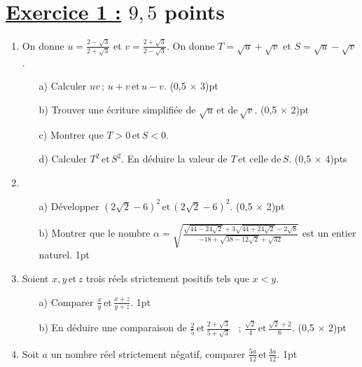 \documentclass[12pt,a4paper]{article}
\begin{document}
\section*{\underline{Exercice 1 :} $9,5$ points}

\begin{enumerate}
    \item On donne \( u = \frac{2 - \sqrt{3}}{2 + \sqrt{3}} \) et \( v = \frac{2 + \sqrt{3}}{2 - \sqrt{3}} \). On donne \( T = \sqrt{u} + \sqrt{v} \) et \( S = \sqrt{u} - \sqrt{v} \). 
    \begin{enumerate}
        \item[a)] Calculer \( uv \, ; \, u + v \, \text{et} \, u - v \). \hfill (0,5 $\times$ 3)pt
        \item[b)] Trouver une écriture simplifiée de \( \sqrt{u} \, \text{et de} \, \sqrt{v} \). \hfill (0,5 $\times$ 2)pt
        \item[c)] Montrer que \( T > 0 \, \text{et} \, S < 0 \). 
        \item[d)] Calculer \( T^2 \, \text{et} \, S^2 \). En déduire la valeur de \( T \, \text{et celle de} \, S \). \hfill (0,5 $\times$ 4)pts
    \end{enumerate}

    \item 
    \begin{enumerate}
        \item[a)] Développer \( (2\sqrt{2} - 6)^2 \, \text{et} \, (2\sqrt{2} - 6)^2 \). \hfill (0,5 $\times$ 2)pt
        \item[b)] Montrer que le nombre 
        \( \alpha = \sqrt{\frac{\sqrt{44 - 24\sqrt{2}} + 3\sqrt{44 + 24\sqrt{2}}- 2\sqrt{8}}{-18 + \sqrt{38 - 12\sqrt{2}} + \sqrt{32}}}        
        \) est un entier naturel. \hfill 1pt
    \end{enumerate}
    \item Soient \( x, y \, \text{et} \, z \) trois réels strictement positifs tels que \( x < y \).
\begin{enumerate}
    \item[a)] Comparer \( \frac{x}{y} \, \text{et} \, \frac{x+z}{y+z} \). \hfill 1pt

    \item[b)] En déduire une comparaison de \( \frac{2}{5} \, \text{et} \, \frac{2 + \sqrt{3}}{5 + \sqrt{3}} \) \, ; \quad 
    \( \frac{\sqrt{2}}{4} \, \text{et} \, \frac{\sqrt{2} + 2}{6} \). \hfill (0,5 $\times$ 2)pt
\end{enumerate}
\item Soit \( a \) un nombre réel strictement négatif, comparer \( \frac{5a}{12} \, \text{et} \, \frac{3a}{12} \). \hfill 1pt
\end{enumerate}
\end{document}
